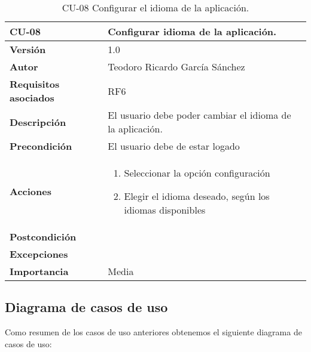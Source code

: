 \begin{table}[p]
	\centering
	\begin{tabularx}{\linewidth}{ p{} p{} }
		\toprule
		\textbf{CU-08}    & \textbf{Configurar idioma de la aplicación.}\\
		\toprule
		\textbf{Versión}              & 1.0    \\
		\textbf{Autor}                & Teodoro Ricardo García Sánchez \\
		\textbf{Requisitos asociados} & RF6 \\
		\textbf{Descripción}          & El usuario debe poder cambiar el idioma de la aplicación.  \\
		\textbf{Precondición}         & El usuario debe de estar logado \\
		\textbf{Acciones}             &
		\begin{enumerate}
			\def\labelenumi{\arabic{enumi}.}
			\tightlist
			\item Seleccionar la opción configuración
			\item Elegir el idioma deseado, según los idiomas disponibles
		\end{enumerate}\\
		\textbf{Postcondición}        &  \\
		\textbf{Excepciones}          &  \\
		\textbf{Importancia}          & Media \\
		\bottomrule
	\end{tabularx}
	\caption{CU-08 Configurar el idioma de la aplicación.}
\end{table}

\subsection{Diagrama de casos de uso}

Como resumen de los casos de uso anteriores obtenemos el siguiente diagrama de casos de uso:



